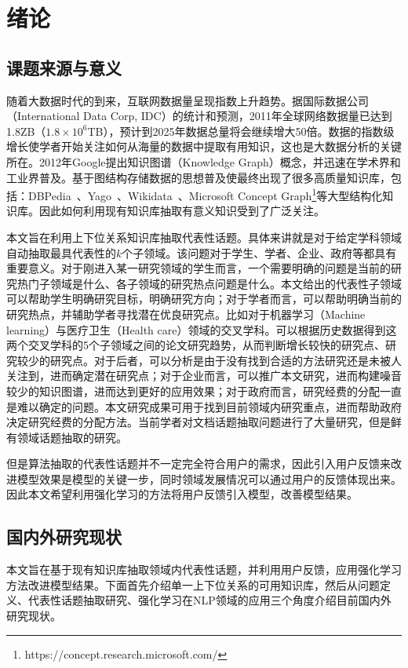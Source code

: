\chapter{绪论}
\section{课题来源与意义}

随着大数据时代的到来，互联网数据量呈现指数上升趋势。据国际数据公司（International Data Corp, IDC）的统计和预测，2011年全球网络数据量已达到1.8ZB（$ 1.8\times10^6 $TB），预计到2025年数据总量将会继续增大50倍。数据的指数级增长使学者开始关注如何从海量的数据中提取有用知识，这也是大数据分析的关键所在。2012年Google提出知识图谱（Knowledge Graph）概念，并迅速在学术界和工业界普及。基于图结构存储数据的思想普及使最终出现了很多高质量知识库，包括：DBPedia~、Yago~、Wikidata~、Microsoft Concept Graph\footnote{https://concept.research.microsoft.com/}等大型结构化知识库。因此如何利用现有知识库抽取有意义知识受到了广泛关注。

本文旨在利用上下位关系知识库抽取代表性话题。具体来讲就是对于给定学科领域自动抽取最具代表性的$ k $个子领域。该问题对于学生、学者、企业、政府等都具有重要意义。对于刚进入某一研究领域的学生而言，一个需要明确的问题是当前的研究热门子领域是什么、各子领域的研究热点问题是什么。本文给出的代表性子领域可以帮助学生明确研究目标，明确研究方向；对于学者而言，可以帮助明确当前的研究热点，并辅助学者寻找潜在优良研究点。比如对于机器学习（Machine learning）与医疗卫生（Health care）领域的交叉学科。可以根据历史数据得到这两个交叉学科的5个子领域之间的论文研究趋势，从而判断增长较快的研究点、研究较少的研究点。对于后者，可以分析是由于没有找到合适的方法研究还是未被人关注到，进而确定潜在研究点；对于企业而言，可以推广本文研究，进而构建噪音较少的知识图谱，进而达到更好的应用效果；对于政府而言，研究经费的分配一直是难以确定的问题。本文研究成果可用于找到目前领域内研究重点，进而帮助政府决定研究经费的分配方法。当前学者对文档话题抽取问题进行了大量研究，但是鲜有领域话题抽取的研究。

但是算法抽取的代表性话题并不一定完全符合用户的需求，因此引入用户反馈来改进模型效果是模型的关键一步，同时领域发展情况可以通过用户的反馈体现出来。因此本文希望利用强化学习的方法将用户反馈引入模型，改善模型结果。


\section{国内外研究现状}
本文旨在基于现有知识库抽取领域内代表性话题，并利用用户反馈，应用强化学习方法改进模型结果。下面首先介绍单一上下位关系的可用知识库，然后从问题定义、代表性话题抽取研究、强化学习在NLP领域的应用三个角度介绍目前国内外研究现状。

